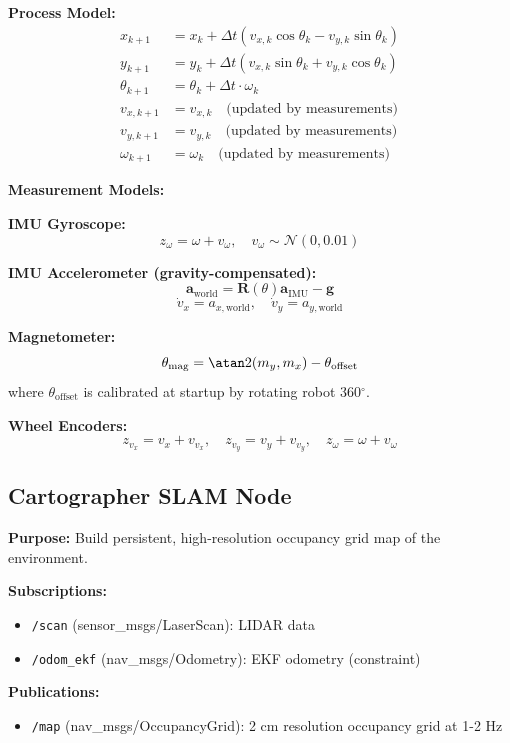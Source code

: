 \documentclass[11pt]{article}
\begin{document}
\textbf{Process Model:}
\begin{align}
x_{k+1} &= x_k + \Delta t (v_{x,k} \cos\theta_k - v_{y,k} \sin\theta_k) \\
y_{k+1} &= y_k + \Delta t (v_{x,k} \sin\theta_k + v_{y,k} \cos\theta_k) \\
\theta_{k+1} &= \theta_k + \Delta t \cdot \omega_k \\
v_{x,k+1} &= v_{x,k} \quad \text{(updated by measurements)} \\
v_{y,k+1} &= v_{y,k} \quad \text{(updated by measurements)} \\
\omega_{k+1} &= \omega_k \quad \text{(updated by measurements)}
\end{align}

\textbf{Measurement Models:}

\textbf{IMU Gyroscope:}
\[
z_{\omega} = \omega + v_{\omega}, \quad v_{\omega} \sim \mathcal{N}(0, 0.01)
\]

\textbf{IMU Accelerometer (gravity-compensated):}
\[
\mathbf{a}_{\text{world}} = \mathbf{R}(\theta) \mathbf{a}_{\text{IMU}} - \mathbf{g}
\]
\[
\dot{v}_x = a_{x,\text{world}}, \quad \dot{v}_y = a_{y,\text{world}}
\]

\textbf{Magnetometer:}
\[
\theta_{\text{mag}} = \atan2(m_y, m_x) - \theta_{\text{offset}}
\]
where $\theta_{\text{offset}}$ is calibrated at startup by rotating robot 360$^\circ$.

\textbf{Wheel Encoders:}
\[
z_{v_x} = v_x + v_{v_x}, \quad z_{v_y} = v_y + v_{v_y}, \quad z_{\omega} = \omega + v_{\omega}
\]

\subsection{Cartographer SLAM Node}

\textbf{Purpose:} Build persistent, high-resolution occupancy grid map of the environment.

\textbf{Subscriptions:}
\begin{itemize}
    \item \texttt{/scan} (sensor\_msgs/LaserScan): LIDAR data
    \item \texttt{/odom\_ekf} (nav\_msgs/Odometry): EKF odometry (constraint)
\end{itemize}

\textbf{Publications:}
\begin{itemize}
    \item \texttt{/map} (nav\_msgs/OccupancyGrid): 2 cm resolution occupancy grid at 1-2 Hz
\end{itemize}
\end{document}
